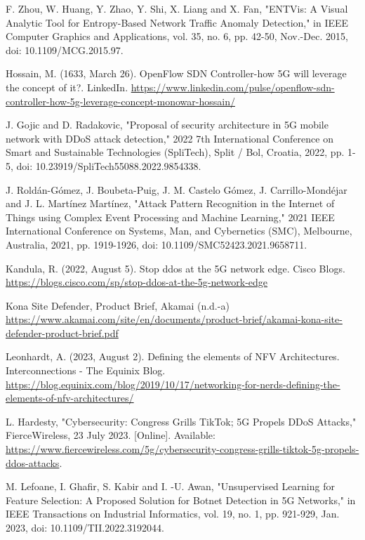 \documentclass[conference]{IEEEtran}
\begin{document}
\begin{thebibliography}{00}
 F. Zhou, W. Huang, Y. Zhao, Y. Shi, X. Liang and X. Fan, "ENTVis: A Visual Analytic Tool for Entropy-Based Network Traffic Anomaly Detection," in IEEE Computer Graphics and Applications, vol. 35, no. 6, pp. 42-50, Nov.-Dec. 2015, doi: 10.1109/MCG.2015.97.

 Hossain, M. (1633, March 26). OpenFlow SDN Controller-how 5G will leverage the concept of it?. LinkedIn. \url{https://www.linkedin.com/pulse/openflow-sdn-controller-how-5g-leverage-concept-monowar-hossain/}

 J. Gojic and D. Radakovic, "Proposal of security architecture in 5G mobile network with DDoS attack detection," 2022 7th International Conference on Smart and Sustainable Technologies (SpliTech), Split / Bol, Croatia, 2022, pp. 1-5, doi: 10.23919/SpliTech55088.2022.9854338.

 J. Roldán-Gómez, J. Boubeta-Puig, J. M. Castelo Gómez, J. Carrillo-Mondéjar and J. L. Martínez Martínez, "Attack Pattern Recognition in the Internet of Things using Complex Event Processing and Machine Learning," 2021 IEEE International Conference on Systems, Man, and Cybernetics (SMC), Melbourne, Australia, 2021, pp. 1919-1926, doi: 10.1109/SMC52423.2021.9658711.

 Kandula, R. (2022, August 5). Stop ddos at the 5G network edge. Cisco Blogs. \url{https://blogs.cisco.com/sp/stop-ddos-at-the-5g-network-edge}

 Kona Site Defender, Product Brief, Akamai (n.d.-a) \url{https://www.akamai.com/site/en/documents/product-brief/akamai-kona-site-defender-product-brief.pdf}

 Leonhardt, A. (2023, August 2). Defining the elements of NFV Architectures. Interconnections - The Equinix Blog. \url{https://blog.equinix.com/blog/2019/10/17/networking-for-nerds-defining-the-elements-of-nfv-architectures/}

 L. Hardesty, "Cybersecurity: Congress Grills TikTok; 5G Propels DDoS Attacks," FierceWireless, 23 July 2023. [Online]. Available: \url{https://www.fiercewireless.com/5g/cybersecurity-congress-grills-tiktok-5g-propels-ddos-attacks}.

 M. Lefoane, I. Ghafir, S. Kabir and I. -U. Awan, "Unsupervised Learning for Feature Selection: A Proposed Solution for Botnet Detection in 5G Networks," in IEEE Transactions on Industrial Informatics, vol. 19, no. 1, pp. 921-929, Jan. 2023, doi: 10.1109/TII.2022.3192044.


\end{thebibliography}
\end{document}
